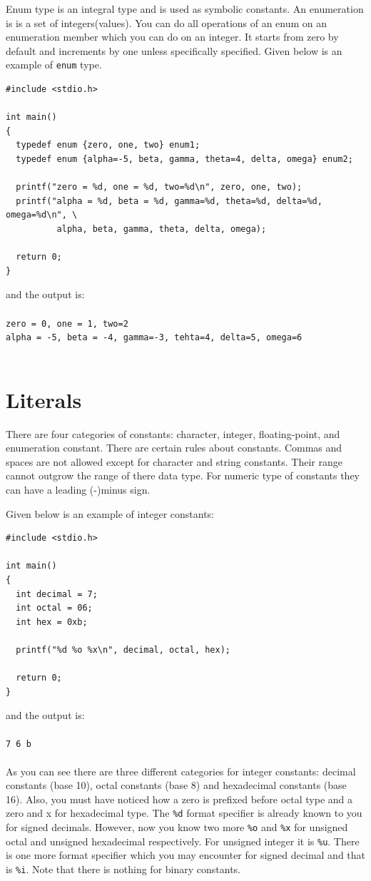 Enum type is an integral type and is used as symbolic constants. An enumeration
is is a set of integers(values). You can do all operations of an enum on an
enumeration member which you can do on an integer. It starts from zero by
default and increments by one unless specifically specified. Given below is an
example of \texttt{enum} type.

\begin{Verbatim}[frame=single]
#include <stdio.h>

int main()
{
  typedef enum {zero, one, two} enum1;
  typedef enum {alpha=-5, beta, gamma, theta=4, delta, omega} enum2;

  printf("zero = %d, one = %d, two=%d\n", zero, one, two);
  printf("alpha = %d, beta = %d, gamma=%d, theta=%d, delta=%d, omega=%d\n", \
          alpha, beta, gamma, theta, delta, omega);

  return 0;
}
\end{Verbatim}

and the output is:
\\\\\texttt{zero = 0, one = 1, two=2\\
alpha = -5, beta = -4, gamma=-3, tehta=4, delta=5, omega=6\\\\}

\section{Literals}
There are four categories of constants: character, integer, floating-point, and
enumeration constant. There are certain rules about constants. Commas and
spaces are not allowed except for character and string constants. Their range
cannot outgrow the range of there data type. For numeric type of constants they
can have a leading (-)minus sign.

Given below is an example of integer constants:

\begin{Verbatim}[frame=single]
#include <stdio.h>

int main()
{
  int decimal = 7;
  int octal = 06;
  int hex = 0xb;

  printf("%d %o %x\n", decimal, octal, hex);

  return 0;
}
\end{Verbatim}

and the output is:
\\\\\texttt{7 6 b\\\\}
As you can see there are three different categories for integer constants:
decimal constants (base 10), octal constants (base 8) and hexadecimal constants
(base 16). Also, you must have noticed how a zero is prefixed before octal type
and a zero and x for hexadecimal type. The \texttt{\%d} format specifier is
already known to you for signed decimals. However, now you know two more
\texttt{\%o} and \texttt{\%x} for unsigned octal and unsigned hexadecimal
respectively. For unsigned integer it is \texttt{\%u}. There is one more format
specifier which you may encounter for signed decimal and that is
\texttt{\%i}. Note that there is nothing for binary constants.

